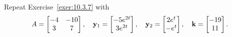 \documentclass{ximera}
\begin{document}
\begin{problem}\label{exer:10.3.9}
Repeat Exercise~\ref{exer:10.3.7}  with
$$
 A=\begin{bmatrix}-4 & -10\\ 3& 7\end{bmatrix}, \quad
{\bf y}_1=\begin{bmatrix}-5e^{2t} \\ 3e^{2t}
\end{bmatrix}, \quad
{\bf y}_2=\begin{bmatrix} 2e^t \\-e^t
\end{bmatrix}, \quad
{\bf k}=\begin{bmatrix}-19 \\ 11\end{bmatrix}. $$
\end{problem}
\end{document}
